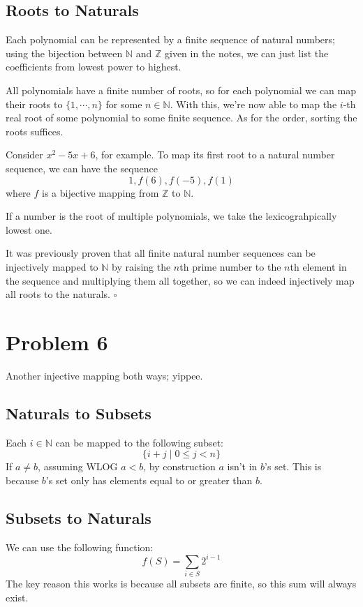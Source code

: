 \documentclass[12pt]{article}
\newcommand{\N}{\mathbb{N}}
\newcommand{\Z}{\mathbb{Z}}
\begin{document}
\subsection{Roots to Naturals}

Each polynomial can be represented by a finite sequence of natural numbers;
using the bijection between $\N$ and $\Z$ given in the notes,
we can just list the coefficients from lowest power to highest.

All polynomials have a finite number of roots, so for each
polynomial we can map their roots to $\{1, \cdots, n\}$ for some $n \in \N$.
With this, we're now able to map the $i$-th real root of some polynomial to some finite sequence.
As for the order, sorting the roots suffices.

Consider $x^2-5x+6$, for example.
To map its first root to a natural number sequence, we can have the sequence
\[1, f(6), f(-5), f(1)\]
where $f$ is a bijective mapping from $\Z$ to $\N$.

If a number is the root of multiple polynomials, we take the lexicograhpically lowest one.

It was previously proven that all finite natural number sequences can be
injectively mapped to $\N$ by raising the $n$th prime number to the $n$th
element in the sequence and multiplying them all together,
so we can indeed injectively map all roots to the naturals. $\square$

\pagebreak

\section{Problem 6}

Another injective mapping both ways; yippee.

\subsection{Naturals to Subsets}

Each $i \in \N$ can be mapped to the following subset:
\[\{i + j \mid 0 \le j < n\}\]
If $a \ne b$, assuming WLOG $a < b$, by construction $a$ isn't in $b$'s set.
This is because $b$'s set only has elements equal to or greater than $b$.

\subsection{Subsets to Naturals}

We can use the following function:
\[f(S)=\sum_{i \in S} 2^{i-1}\]
The key reason this works is because all subsets are finite, so this sum will always exist.
\end{document}
